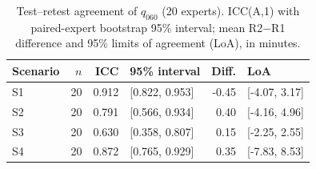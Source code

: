 \begin{table}[tb]
\centering
\caption{Test--retest agreement of $q_{060}$ (20 experts). ICC(A,1) with paired-expert bootstrap 95\% interval; mean R2$-$R1 difference and 95\% limits of agreement (LoA), in minutes.}
\label{tab:reliability20}
\scriptsize\setlength{\tabcolsep}{3pt}
\begin{tabular}{@{}lrrlrl@{}}
\toprule
Scenario & $n$ & ICC & 95\% interval & Diff. & LoA\\\midrule
S1 & 20 & 0.912 & [0.822, 0.953] & -0.45 & [-4.07, 3.17]\\
S2 & 20 & 0.791 & [0.566, 0.934] & 0.40 & [-4.16, 4.96]\\
S3 & 20 & 0.630 & [0.358, 0.807] & 0.15 & [-2.25, 2.55]\\
S4 & 20 & 0.872 & [0.765, 0.929] & 0.35 & [-7.83, 8.53]\\
\bottomrule
\end{tabular}
\end{table}
